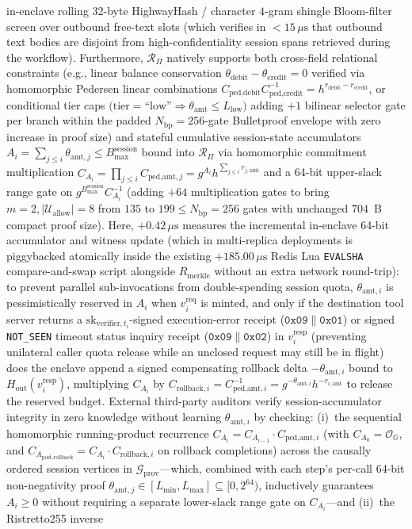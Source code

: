 \documentclass[conference,10pt]{IEEEtran}
\begin{document}
in-enclave rolling 32-byte HighwayHash / character $4$-gram shingle Bloom-filter screen over outbound free-text slots (which verifies in $< 15\,\mu\text{s}$ that outbound text bodies are disjoint from high-confidentiality session spans retrieved during the workflow). Furthermore, $\mathcal{R}_{\Pi}$ natively supports both cross-field relational constraints (e.g., linear balance conservation $\theta_{\text{debit}} - \theta_{\text{credit}} = 0$ verified via homomorphic Pedersen linear combinations $C_{\text{ped,debit}} C_{\text{ped,credit}}^{-1} = h^{r_{\text{debit}} - r_{\text{credit}}}$, or conditional tier caps $\big(\text{tier}=\text{``low''} \Rightarrow \theta_{\text{amt}} \le L_{\text{low}}\big)$ adding $+1$ bilinear selector gate per branch within the padded $N_{\text{bp}} = 256$-gate Bulletproof envelope with zero increase in proof size) and stateful cumulative session-state accumulators $A_i = \sum_{j \le i} \theta_{\text{amt}, j} \le B_{\max}^{\text{session}}$ bound into $\mathcal{R}_{\Pi}$ via homomorphic commitment multiplication $C_{A_i} = \prod_{j \le i} C_{\text{ped,amt}, j} = g^{A_i} h^{\sum_{j \le i} r_{j,\text{amt}}}$ and a 64-bit upper-slack range gate on $g^{B_{\max}^{\text{session}}} C_{A_i}^{-1}$ (adding $+64$ multiplication gates to bring $m=2, |\mathcal{U}_{\text{allow}}|=8$ from $135$ to $199 \le N_{\text{bp}} = 256$ gates with unchanged $704$~B compact proof size). Here, $+0.42\,\mu\text{s}$ measures the incremental in-enclave 64-bit accumulator and witness update (which in multi-replica deployments is piggybacked atomically inside the existing $+185.00\,\mu\text{s}$ Redis Lua \texttt{EVALSHA} compare-and-swap script alongside $R_{\text{merkle}}$ without an extra network round-trip): to prevent parallel sub-invocations from double-spending session quota, $\theta_{\text{amt}, i}$ is pessimistically reserved in $A_i$ when $v_i^{\text{req}}$ is minted, and only if the destination tool server returns a $\text{sk}_{\text{verifier}, t_i}$-signed execution-error receipt ($\mathtt{0x09} \parallel \mathtt{0x01}$) or signed \texttt{NOT\_SEEN} timeout status inquiry receipt ($\mathtt{0x09} \parallel \mathtt{0x02}$) in $v_i^{\text{resp}}$ (preventing unilateral caller quota release while an unclosed request may still be in flight) does the enclave append a signed compensating rollback delta $-\theta_{\text{amt}, i}$ bound to $H_{\text{out}}(v_i^{\text{resp}})$, multiplying $C_{A_i}$ by $C_{\text{rollback}, i} = C_{\text{ped,amt}, i}^{-1} = g^{-\theta_{\text{amt}, i}} h^{-r_{i,\text{amt}}}$ to release the reserved budget. External third-party auditors verify session-accumulator integrity in zero knowledge without learning $\theta_{\text{amt}, i}$ by checking: (i)~the sequential homomorphic running-product recurrence $C_{A_i} = C_{A_{i-1}} \cdot C_{\text{ped,amt}, i}$ (with $C_{A_0} = \mathcal{O}_{\mathbb{G}}$, and $C_{A_{\text{post-rollback}}} = C_{A_i} \cdot C_{\text{rollback}, i}$ on rollback completions) across the causally ordered session vertices in $\mathcal{G}_{\text{prov}}$---which, combined with each step's per-call 64-bit non-negativity proof $\theta_{\text{amt}, j} \in [L_{\min}, L_{\max}] \subseteq [0, 2^{64})$, inductively guarantees $A_i \ge 0$ without requiring a separate lower-slack range gate on $C_{A_i}$---and (ii)~the Ristretto255 inverse 
\end{document}
